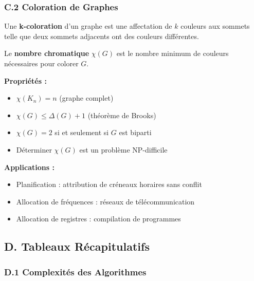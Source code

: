 \documentclass[12pt,a4paper]{article}
\begin{document}
\newpage
\subsubsection*{C.2 Coloration de Graphes}

\begin{definition}
Une \textcolor{titrebleu}{\textbf{k-coloration}} d'un graphe est une affectation de $k$ couleurs aux sommets telle que deux sommets adjacents ont des couleurs différentes.

Le \textcolor{defvert}{\textbf{nombre chromatique}} $\chi(G)$ est le nombre minimum de couleurs nécessaires pour colorer $G$.
\end{definition}

\begin{astuce}
\textbf{Propriétés :}
\begin{itemize}
    \item $\chi(K_n) = n$ (graphe complet)
    \item $\chi(G) \leq \Delta(G) + 1$ (théorème de Brooks)
    \item $\chi(G) = 2$ si et seulement si $G$ est biparti
    \item Déterminer $\chi(G)$ est un problème NP-difficile
\end{itemize}
\end{astuce}

\begin{exemple}
\textbf{Applications :}
\begin{itemize}
    \item \textcolor{titrebleu}{Planification} : attribution de créneaux horaires sans conflit
    \item \textcolor{defvert}{Allocation de fréquences} : réseaux de télécommunication
    \item \textcolor{algoviolet}{Allocation de registres} : compilation de programmes
\end{itemize}
\end{exemple}

\newpage
\subsection*{D. Tableaux Récapitulatifs}

\subsubsection*{D.1 Complexités des Algorithmes}
\end{document}
